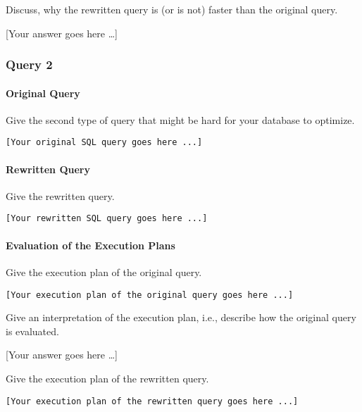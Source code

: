 \documentclass[11pt]{scrartcl}
\newcommand{\youranswerhere}{[Your answer goes here \ldots]}
\begin{document}
    Discuss, why the rewritten query is (or is not) faster than the original query.

    \youranswerhere{}

    \subsubsection*{Query 2}

    \paragraph{Original Query}

    Give the second type of query that might be hard for your database to optimize.

    \begin{lstlisting}[style=dbtsql]
[Your original SQL query goes here ...]
    \end{lstlisting}

    \paragraph{Rewritten Query}

    Give the rewritten query.

    \begin{lstlisting}[style=dbtsql]
[Your rewritten SQL query goes here ...]
    \end{lstlisting}

    \paragraph{Evaluation of the Execution Plans}

    Give the execution plan of the original query.

            {\small
    \parskip0pt\begin{verbatim}
[Your execution plan of the original query goes here ...]
    \end{verbatim}}

    Give an interpretation of the execution plan, i.e., describe how the original query is evaluated.

    \youranswerhere{}

    Give the execution plan of the rewritten query.

            {\small
    \parskip0pt\begin{verbatim}
[Your execution plan of the rewritten query goes here ...]
    \end{verbatim}}
\end{document}
